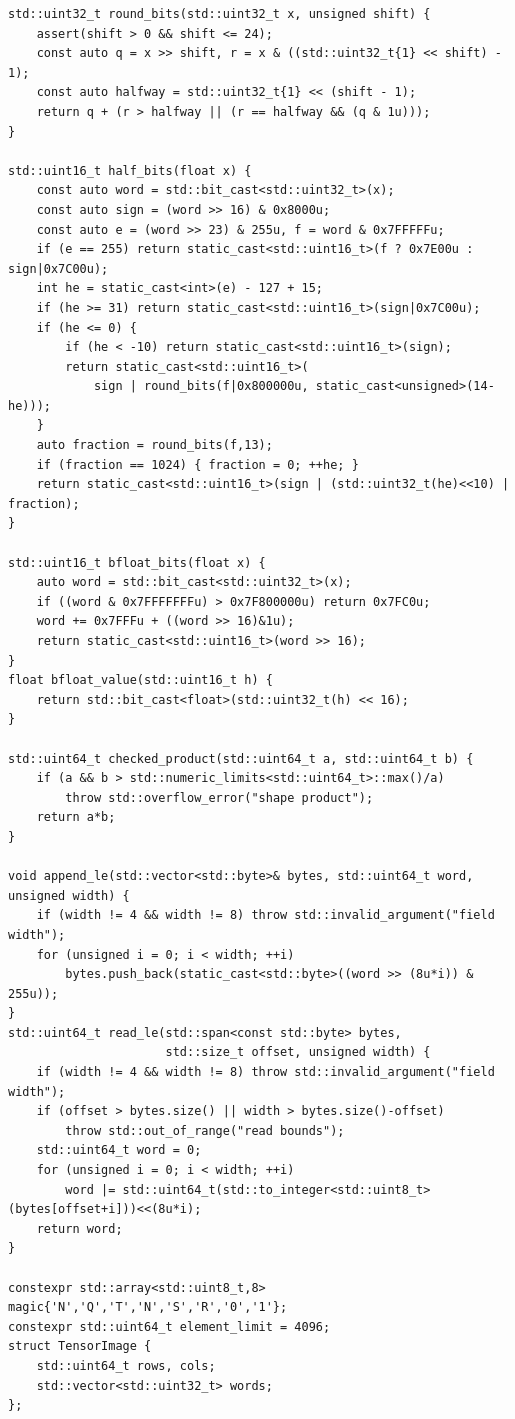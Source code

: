 \begin{verbatim}
std::uint32_t round_bits(std::uint32_t x, unsigned shift) {
    assert(shift > 0 && shift <= 24);
    const auto q = x >> shift, r = x & ((std::uint32_t{1} << shift) - 1);
    const auto halfway = std::uint32_t{1} << (shift - 1);
    return q + (r > halfway || (r == halfway && (q & 1u)));
}

std::uint16_t half_bits(float x) {
    const auto word = std::bit_cast<std::uint32_t>(x);
    const auto sign = (word >> 16) & 0x8000u;
    const auto e = (word >> 23) & 255u, f = word & 0x7FFFFFu;
    if (e == 255) return static_cast<std::uint16_t>(f ? 0x7E00u : sign|0x7C00u);
    int he = static_cast<int>(e) - 127 + 15;
    if (he >= 31) return static_cast<std::uint16_t>(sign|0x7C00u);
    if (he <= 0) {
        if (he < -10) return static_cast<std::uint16_t>(sign);
        return static_cast<std::uint16_t>(
            sign | round_bits(f|0x800000u, static_cast<unsigned>(14-he)));
    }
    auto fraction = round_bits(f,13);
    if (fraction == 1024) { fraction = 0; ++he; }
    return static_cast<std::uint16_t>(sign | (std::uint32_t(he)<<10) | fraction);
}

std::uint16_t bfloat_bits(float x) {
    auto word = std::bit_cast<std::uint32_t>(x);
    if ((word & 0x7FFFFFFFu) > 0x7F800000u) return 0x7FC0u;
    word += 0x7FFFu + ((word >> 16)&1u);
    return static_cast<std::uint16_t>(word >> 16);
}
float bfloat_value(std::uint16_t h) {
    return std::bit_cast<float>(std::uint32_t(h) << 16);
}

std::uint64_t checked_product(std::uint64_t a, std::uint64_t b) {
    if (a && b > std::numeric_limits<std::uint64_t>::max()/a)
        throw std::overflow_error("shape product");
    return a*b;
}

void append_le(std::vector<std::byte>& bytes, std::uint64_t word, unsigned width) {
    if (width != 4 && width != 8) throw std::invalid_argument("field width");
    for (unsigned i = 0; i < width; ++i)
        bytes.push_back(static_cast<std::byte>((word >> (8u*i)) & 255u));
}
std::uint64_t read_le(std::span<const std::byte> bytes,
                      std::size_t offset, unsigned width) {
    if (width != 4 && width != 8) throw std::invalid_argument("field width");
    if (offset > bytes.size() || width > bytes.size()-offset)
        throw std::out_of_range("read bounds");
    std::uint64_t word = 0;
    for (unsigned i = 0; i < width; ++i)
        word |= std::uint64_t(std::to_integer<std::uint8_t>(bytes[offset+i]))<<(8u*i);
    return word;
}

constexpr std::array<std::uint8_t,8> magic{'N','Q','T','N','S','R','0','1'};
constexpr std::uint64_t element_limit = 4096;
struct TensorImage {
    std::uint64_t rows, cols;
    std::vector<std::uint32_t> words;
};


\end{verbatim}
